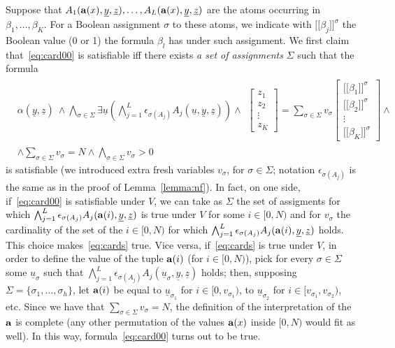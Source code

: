 \documentclass[11pt,a4paper]{article}
\newcommand{\uu}{\ensuremath{\underline u}}
\newcommand{\uy}{\ensuremath{\underline y}}
\newcommand{\uz}{\ensuremath{\underline z}}
\newcommand{\ta}{\ensuremath{{\bf a}}\xspace}
\begin{document}
Suppose that $A_1(\ta(x), \uy, \uz), \dots, A_L(\ta(x), \uy, \uz)$ are the atoms occurring in 
$\beta_1, \dots, \beta_K$. For a Boolean assignment $\sigma$ to these atoms, we indicate with $\lbrack\!\lbrack \beta_j\rbrack\!\rbrack^\sigma$ the Boolean value (0 or 1) the 
 formula $\beta_l$ has under such assignment. We first claim that~\eqref{eq:card00} is satisfiable iff there exists \emph{a set of assignments} $\Sigma$ such that the formula
\begin{equation}\label{eq:cards}
\begin{aligned}
 &\alpha(\uy, \uz)~ \wedge \bigwedge_{\sigma\in \Sigma} \exists \uu \left(\bigwedge_{j=1}^L \epsilon_{\sigma(A_j)} A_j(\uu, \uy, \uz)\right)  \wedge
 \begin{aligned}
    \begin{bmatrix}
           z_{1} \\
           z_{2} \\
           \vdots \\
           z_{K}
     \end{bmatrix}
         = \sum_{\sigma\in \Sigma} v_{	\sigma} 
     \begin{bmatrix}
           \lbrack\!\lbrack \beta_1\rbrack\!\rbrack^\sigma \\
            \lbrack\!\lbrack \beta_2\rbrack\!\rbrack^\sigma \\
           \vdots \\
            \lbrack\!\lbrack \beta_K\rbrack\!\rbrack^\sigma
     \end{bmatrix}
     \wedge
   \end{aligned}   
   \\  
        &\wedge \sum_{\sigma\in \Sigma} v_{\sigma} = N      
\wedge\bigwedge_{\sigma\in \Sigma} v_{\sigma} > 0
 \end{aligned}  
\end{equation}
is satisfiable (we introduced extra fresh variables $v_{\sigma}$, for $\sigma\in \Sigma$; notation $\epsilon_{\sigma(A_j)}$ is the same as in the proof of Lemma~\ref{lemma:nf}).
In fact, on one side, if~\eqref{eq:card00} is satisfiable under $V$, we can take as $\Sigma$ the set of assigments for which $\bigwedge_{j=1}^L \epsilon_{\sigma(A_j)} A_j(\ta(i), \uy, \uz)$
is true under $V$  for some $i\in [0, N)$ and for $v_{\sigma}$ the cardinality of the set of the $i\in [0, N)$ for which $\bigwedge_{j=1}^L \epsilon_{\sigma(A_j)} A_j(\ta(i), \uy, \uz)$ holds.
This choice makes~\eqref{eq:cards} true. 
Vice versa, if~\eqref{eq:cards} is true under $V$, in order to define the value of the tuple $\ta(i)$ (for $i\in [0,N)$), pick for every $\sigma\in \Sigma$ some $\uu_\sigma$ such that  
 $\bigwedge_{j=1}^L \epsilon_{\sigma(A_j)} A_j(\uu_{\sigma}, \uy, \uz)$ holds; then, supposing $\Sigma=\{\sigma_1, \dots, \sigma_h\}$, let $\ta(i)$ be equal to $\uu_{\sigma_1}$ for $i\in [0, v_{\sigma_1})$, to
  $\uu_{\sigma_2}$ for $i\in [v_{\sigma_1}, v_{\sigma_2})$, etc.
  Since we have that $ \sum_{\sigma\in \Sigma} v_{\sigma} = N $, the definition of the interpretation of the $\ta$ is complete (any other permutation of the values 
  $\ta(x)$ inside $[0, N)$ would fit as well).
  In this way, formula~\eqref{eq:card00} turns out to be true.
\end{document}
